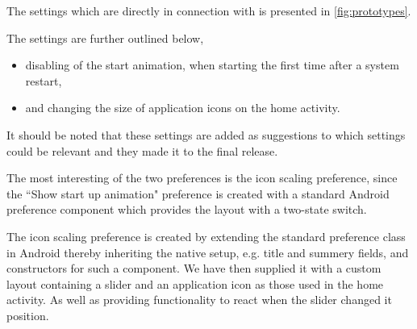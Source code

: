The settings which are directly in connection with \launcher is presented in \cref{fig:prototypes}.

The settings are further outlined below,
\begin{itemize}
 	\item disabling of the start animation, when starting \launcher the first time after a system restart,
 	\item and changing the size of application icons on the home activity.
\end{itemize} 
It should be noted that these settings are added as suggestions to which settings could be relevant and they made it to the final release.

The most interesting of the two preferences is the icon scaling preference, since the ``Show start up animation" preference is created with a standard Android preference component which provides the layout with a two-state switch.

The icon scaling preference is created by extending the standard preference class in Android thereby inheriting the native setup, e.g. title and summery fields, and constructors for such a component.
We have then supplied it with a custom layout containing a slider and an application icon as those used in the home activity. As well as providing functionality to react when the slider changed it position.